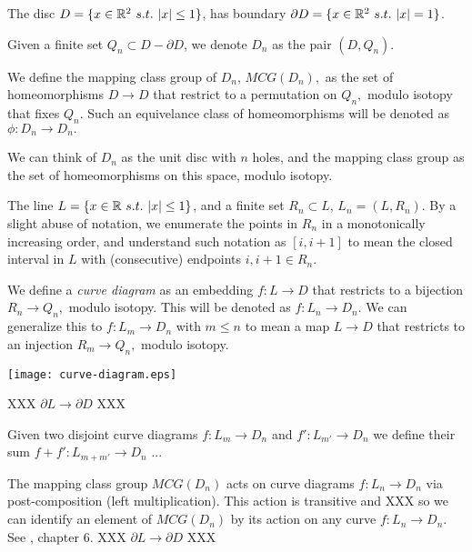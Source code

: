 \documentclass[11pt,a4paper]{article}
\begin{document}

The disc $D = \{ x\in \mathR^2\ s.t.\ |x|\leq 1 \} $,
has boundary $\partial D = \{ x\in \mathbb{R}^2\ s.t.\ |x|=1 \} $.

Given a finite set $ Q_n \subset D-\partial D$,
we denote $D_n$ as the pair $(D, Q_n).$

We define the mapping class group of $D_n$,
$MCG(D_n),$ as the set of homeomorphisms $D\to D$ that
restrict to a permutation on $Q_n,$ modulo isotopy that
fixes $Q_n.$
Such an equivelance class
of homeomorphisms will be denoted as $\phi:D_n\to D_n.$

We can think of $D_n$ as the unit disc with $n$ holes,
and the mapping class group as the set of homeomorphisms on
this space, modulo isotopy.

The line $L = \{ x\in \mathbb{R}\ s.t.\ |x|\leq 1 \} $,
and a finite set $R_n\subset L$,
$L_n = (L, R_n).$
By a slight abuse of notation, we enumerate the points in $R_n$ 
in a monotonically increasing order,
and understand such notation as $[i, i+1]$ to mean the closed interval in $L$
with (consecutive) endpoints $i, i+1 \in R_n.$

We define a {\it curve diagram} as an embedding $f : L\to D$ that
restricts to a bijection $R_n\to Q_n,$ modulo
isotopy.
This will be denoted as $f : L_n\to D_n.$
We can generalize this to $f : L_m\to D_n$ with $m\leq n$
to mean a map $L\to D$ that restricts to an injection $R_m\to Q_n,$
modulo isotopy.

\begin{center}
\texttt{[image: curve-diagram.eps]}
\end{center}

XXX $\partial L\to \partial D$ XXX

Given two disjoint curve diagrams $f:L_m\to D_n$ and $f':L_{m'}\to D_n$
we define their sum  $f+f':L_{m+m'}\to D_n$ ...



The mapping class group $MCG(D_n)$ acts on curve diagrams $f : L_n\to D_n$
via post-composition (left multiplication).
This action is transitive and XXX so we can identify an element of
$MCG(D_n)$ by its action on any curve $f:L_n\to D_n.$
See \cite{Dehornoy02}, chapter 6.
XXX $\partial L\to \partial D$ XXX
\end{document}
